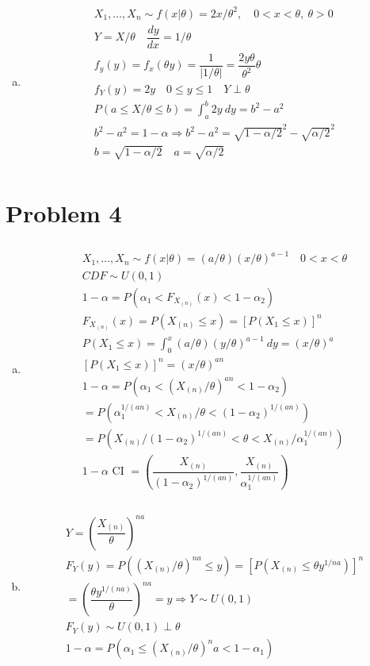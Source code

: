 \documentclass{article}
\newcommand{\ta}{\theta}
\newcommand{\samp}{X_1,\dots,X_n \sim}
\newcommand{\Xn}{X_{(n)}}
\newcommand{\al}{\alpha}
\begin{document}
\begin{flushleft}
\begin{enumerate}[(a)]
	\item 
\begin{multline*}\\
\samp f(x|\ta)=2x/\ta^2, \quad 0<x<\ta, \ \ta>0\\
Y=X/\ta \quad \dfrac{dy}{dx}=1/\ta\\
f_y(y)=f_x(\ta y)=\dfrac{1}{|1/\ta|}=\dfrac{2y\ta}{\ta^2}\ta\\ 
f_Y(y)=2y \quad 0\leq y\leq 1 \quad Y\perp \ta\\ 
P(a\leq X/\ta\leq b)=\int_{a}^{b}2y \ dy=b^2-a^2\\
b^2-a^2=1-\al \Rightarrow b^2-a^2=\sqrt{1-\al/2}^2-\sqrt{\al/2}^2\\
b=\sqrt{1-\al/2} \quad a=\sqrt{\al/2}\\
\end{multline*}

	
\end{enumerate}

	\section*{Problem 4}
	
\begin{enumerate}[(a)]
	
	\item 	
\begin{multline*}\\
\samp f(x|\ta)=(a/\ta)(x/\ta)^{a-1} \quad 0<x<\ta\\
CDF\sim U(0,1)\\
1-\alpha=P(\al_1<F_{\Xn}(x)<1-\al_2)\\
F_{\Xn}(x)=P(\Xn\leq x)=[P(X_1\leq x)]^n\\
P(X_1\leq x)=\int_{0}^{x}(a/\ta)(y/\ta)^{a-1}\ dy=(x/\ta)^{a}\\
[P(X_1\leq x)]^n=(x/\ta)^{an}\\
1-\al=P(\al_1<(\Xn/\ta)^{an}<1-\al_2)\\
=P(\al_1^{1/(an)}<\Xn/\ta<(1-\al_2)^{1/(an)})\\
=P(\Xn/(1-\al_2)^{1/(an)}<\ta<\Xn/\al_1^{1/(an)})\\
1-\al \text{ CI }= \left(\dfrac{\Xn}{(1-\al_2)^{1/(an)}},\dfrac{\Xn}{\al_1^{1/(an)}} \right)\\
\end{multline*}

	\item 
\begin{multline*}\\
Y=\left(\dfrac{\Xn}{\ta} \right)^{na}\\
F_Y(y)=P((\Xn/\ta)^{na}\leq y)=[P(\Xn\leq \ta y^{1/na})]^n\\
=\left(\dfrac{\ta y^{1/(na)}}{\ta}\right)^{na}=y \Rightarrow Y\sim U(0,1)\\
F_Y(y)\sim U(0,1) \perp \ta\\
1-\al=P(\al_1\leq (\Xn/\ta)^na<1-\al_1)\\
\end{multline*}


\end{enumerate}
\end{flushleft}
\end{document}
